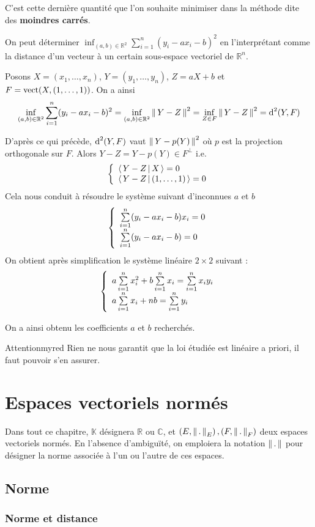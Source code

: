     C’est cette dernière quantité que l’on souhaite minimiser dans la méthode dite des \textbf{moindres carrés}.

    On peut déterminer $\inf_{(a,b) \in \mathbb{R}^2} \sum\limits_{i=1}^n (y_i -ax_i - b)^2$ en l’interprétant comme la distance d’un vecteur à un certain sous-espace vectoriel de $\mathbb{R}^n$.

    Posons $X = (x_1,\ldots,x_n)$, $Y = (y_1,\ldots,y_n)$, $Z = aX + b$ et $F = \operatorname{vect}(X,(1,\ldots,1))$. On a ainsi 
    \[ \inf_{(a,b) \in \mathbb{R}^2} \sum\limits_{i=1}^n (y_i -ax_i - b)^2 = \inf_{(a,b) \in \mathbb{R}^2} \left\lVert \,Y - Z \, \right\rVert^2 = \inf_{Z \in F} \left\lVert \,Y - Z \, \right\rVert^2 = \operatorname{d}^2(Y,F) \]
 
    D’après ce qui précède, $\operatorname{d}^2(Y,F)$ vaut $\left\lVert \,Y - p(Y) \, \right\rVert^2$ où $p$ est la projection orthogonale sur $F$. Alors $Y - Z = Y - p(Y) \in F^{\perp}$ i.e. 
    \[ \et{\spr{Y-Z}{X} = 0}{\spr{Y-Z}{(1,\ldots,1)} = 0} \] 
    Cela nous conduit à résoudre le système suivant d’inconnues $a$ et $b$ 
    \[ \et{\sum\limits_{i = 1}^n (y_i - ax_i - b)x_i = 0}{\sum\limits_{i = 1}^n (y_i - ax_i - b) = 0} \] 
    On obtient après simplification le système linéaire $2 \times 2$ suivant :
    \[ \et{a \sum\limits_{i = 1}^n x_i^2 + b \sum\limits_{i=1}^n x_i = \sum\limits_{i=1}^n x_i y_i}{a \sum\limits_{i=1}^n x_i + nb = \sum\limits_{i = 1}^n y_i} \]

    On a ainsi obtenu les coefficients $a$ et $b$ recherchés. 

    \begin{omed}{Attention}{myred}
        Rien ne nous garantit que la loi étudiée est linéaire a priori, il faut pouvoir s’en assurer.
    \end{omed}

\section{Espaces vectoriels normés}

Dans tout ce chapitre, $\mathbb{K}$ désignera $\mathbb{R}$ ou $\mathbb{C}$, et $\left(E,\left\lVert \,. \, \right\rVert_E\right), \left(F, \left\lVert \,. \, \right\rVert_F\right)$ deux espaces vectoriels normés. En l’absence d’ambiguïté, on emploiera la notation $\left\lVert \,. \, \right\rVert$ pour désigner la norme associée à l’un ou l’autre de ces espaces.

\subsection{Norme}

    \subsubsection{Norme et distance}

